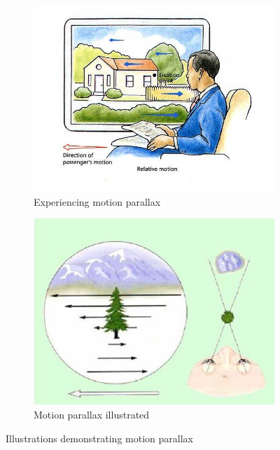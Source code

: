 \begin{figure}[h!]
	\centering
	\begin{subfigure}[h!]{0.45\textwidth}
		\includegraphics[width=\textwidth]{figures/cue8.jpg}
		\caption{Experiencing motion parallax \cite{Parallax0}}\label{fig:cue8}
	\end{subfigure}
	\begin{subfigure}[h!]{0.45\textwidth}
		\includegraphics[width=\textwidth]{figures/cue9.jpg}
		\caption{Motion parallax illustrated \cite{Skybrary}}\label{fig:cue9}
	\end{subfigure}
	\caption{Illustrations demonstrating motion parallax}\label{fig:parallax}
\end{figure}

